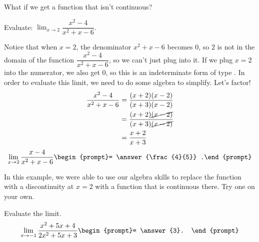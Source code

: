 \documentclass{ximera}
\begin{document}
What if we get a function that isn't continuous?  
\begin{example}
	Evaluate: $\displaystyle \lim_{x\to 2} \dfrac{x^2-4}{x^2+x-6}$.
	\begin{explanation}
		Notice that when $x = 2$, the denominator $x^2+x-6$ becomes $0$, so $2$ is not in the domain of the function $\dfrac{x^2-4}{x^2+x-6}$, so we can't just plug into it.
		If we plug $x=2$ into the numerator, we also get $0$, so this is an indeterminate form of type \zeroOverZero.  In order to evaluate this limit, we need to do some algebra to simplify.
		Let's factor!
		\begin{align*}
			\dfrac{x^2-4}{x^2+x-6} &= \dfrac{(x+2)(x-2)}{(x+3)(x-2)}\\
				&= \dfrac{(x+2)\cancel{(x-2)}}{(x+3)\cancel{(x-2)}}\\
				&= \dfrac{x+2}{x+3}
		\end{align*}
		\[ \lim_{x\to 2} \dfrac{x-4}{x^2+x-6} \begin{prompt}= \answer{\frac{4}{5}} .\end{prompt}  \]	
	\end{explanation}
\end{example}

In this example, we were able to use our algebra skills to replace the function with a discontinuity at $x=2$ with a function that is continuous there.  Try one on your own.
\begin{problem}
	Evaluate the limit.
	\[ \lim_{x\to -1} \frac{x^2+5x+4}{2x^2+5x+3} \begin{prompt}= \answer{3}. \end{prompt} \]
\end{problem}
\end{document}
